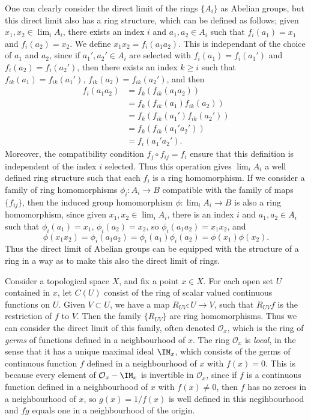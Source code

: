 One can clearly consider the direct limit of the rings $\{ A_i \}$ as Abelian groups, but this direct limit also has a ring structure, which can be defined as follows; given $x_1, x_2 \in \lim_i A_i$, there exists an index $i$ and $a_1, a_2 \in A_i$ such that $f_i(a_1) = x_1$ and $f_i(a_2) = x_2$. We define $x_1x_2 = f_i(a_1a_2)$. This is independant of the choice of $a_1$ and $a_2$, since if $a_1', a_2' \in A_i$ are selected with $f_i(a_1) = f_i(a_1')$ and $f_i(a_2) = f_i(a_2')$, then there exists an index $k \geq i$ such that $f_{ik}(a_1) = f_{ik}(a_1')$, $f_{ik}(a_2) = f_{ik}(a_2')$, and then
%
\begin{align*}
    f_i(a_1a_2) &= f_k(f_{ik}(a_1a_2))\\
    &= f_k(f_{ik}(a_1) f_{ik}(a_2))\\
    &= f_k(f_{ik}(a_1') f_{ik}(a_2'))\\
    &= f_k(f_{ik}(a_1'a_2'))\\
    &= f_i(a_1'a_2').
\end{align*}
%
Moreover, the compatibility condition $f_j \circ f_{ij} = f_i$ ensure that this definition is independent of the index $i$ selected. Thus this operation gives $\lim_i A_i$ a well defined ring structure such that each $f_i$ is a ring homomorphism. If we consider a family of ring homomorphisms $\phi_i: A_i \to B$ compatible with the family of maps $\{ f_{ij} \}$, then the induced group homomorphism $\phi: \lim_i A_i \to B$ is also a ring homomorphism, since given $x_1,x_2 \in \lim_i A_i$, there is an index $i$ and $a_1,a_2 \in A_i$ such that $\phi_i(a_1) = x_1$, $\phi_i(a_2) = x_2$, so $\phi_i(a_1a_2) = x_1x_2$, and
%
\[ \phi(x_1x_2) = \phi_i(a_1a_2) = \phi_i(a_1) \phi_i(a_2) = \phi(x_1) \phi(x_2). \]
%
Thus the direct limit of Abelian groups can be equipped with the structure of a ring in a way as to make this also the direct limit of rings.

\begin{example}
    Consider a topological space $X$, and fix a point $x \in X$. For each open set $U$ contained in $x$, let $C(U)$ consist of the ring of scalar valued continuous functions on $U$. Given $V \subset U$, we have a map $R_{UV}: U \to V$, such that $R_{UV}f$ is the restriction of $f$ to $V$. Then the family $\{ R_{UV} \}$ are ring homomorphisms. Thus we can consider the direct limit of this family, often denoted $\mathcal{O}_x$, which is the ring of \emph{germs} of functions defined in a neighbourhood of $x$. The ring $\mathcal{O}_x$ is \emph{local}, in the sense that it has a unique maximal ideal $\IM_x$, which consists of the germs of continuous function $f$ defined in a neighbourhood of $x$ with $f(x) = 0$. This is because every element of $\mathcal{O}_x - \IM_x$ is invertible in $\mathcal{O}_x$, since if $f$ is a continuous function defined in a neighbourhood of $x$ with $f(x) \neq 0$, then $f$ has no zeroes in a neighbourhood of $x$, so $g(x) = 1/f(x)$ is well defined in this negihbourhood and $fg$ equals one in a neighbourhood of the origin.
\end{example}

